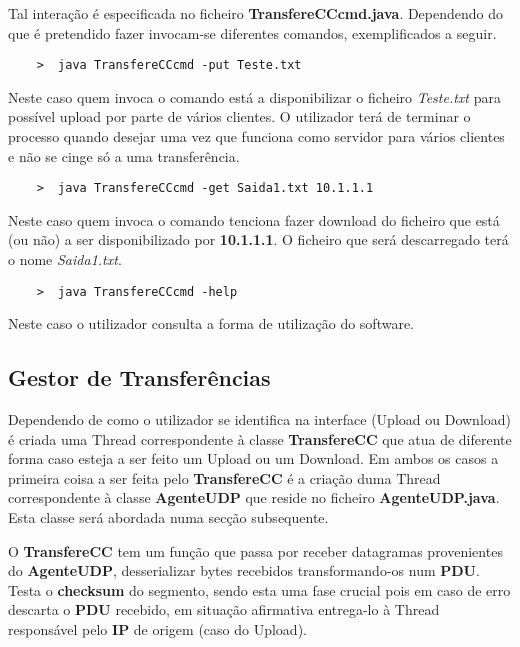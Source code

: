 \documentclass{llncs}
\begin{document}
Tal interação é especificada no ficheiro \textbf{TransfereCCcmd.java}. Dependendo do que é pretendido fazer invocam-se diferentes comandos, exemplificados a seguir.

\begin{verbatim}
	>  java TransfereCCcmd -put Teste.txt
\end{verbatim}

Neste caso quem invoca o comando está a disponibilizar o ficheiro \textit{Teste.txt} para possível upload por parte de vários clientes. O utilizador terá de terminar o processo quando desejar uma vez que funciona como servidor para vários clientes e não se cinge só a uma transferência.

\begin{verbatim}
	>  java TransfereCCcmd -get Saida1.txt 10.1.1.1
\end{verbatim}

Neste caso quem invoca o comando tenciona fazer download do ficheiro que está (ou não) a ser disponibilizado por \textbf{10.1.1.1}. O ficheiro que será descarregado terá o nome \textit{Saida1.txt}.

\begin{verbatim}
	>  java TransfereCCcmd -help
\end{verbatim}

Neste caso o utilizador consulta a forma de utilização do software.


\subsection{Gestor de Transferências}

Dependendo de como o utilizador se identifica na interface (Upload ou Download) é criada uma Thread correspondente à classe \textbf{TransfereCC} que atua de diferente forma caso esteja a ser feito um Upload ou um Download. Em ambos os casos a primeira coisa a ser feita pelo \textbf{TransfereCC} é a criação duma Thread correspondente à classe \textbf{AgenteUDP} que reside no ficheiro \textbf{AgenteUDP.java}. Esta classe será abordada numa secção subsequente.

O \textbf{TransfereCC} tem um função que passa por receber datagramas provenientes do \textbf{AgenteUDP}, desserializar bytes recebidos transformando-os num \textbf{PDU}. Testa o \textbf{checksum} do segmento, sendo esta uma fase crucial pois em caso de erro descarta o \textbf{PDU} recebido, em situação afirmativa entrega-lo à Thread responsável pelo \textbf{IP} de origem (caso do Upload).
\end{document}

